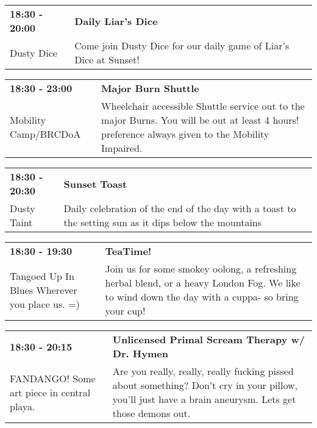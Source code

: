 \begin{tabular}{ p{1in} p{2.2in} }
    \textbf{18:30 - 20:00} & \textbf{Daily Liar's Dice} \\
    Dusty Dice \newline  & Come join Dusty Dice for our daily game of Liar's Dice at Sunset! \\
    \hline 
\end{tabular}
    
\begin{tabular}{ p{1in} p{2.2in} }
    \textbf{18:30 - 23:00} & \textbf{Major Burn Shuttle} \\
    Mobility Camp/BRCDoA \newline  & Wheelchair accessible Shuttle service out to the major Burns. You will be out at least 4 hours! preference always given to the Mobility Impaired. \\
    \hline 
\end{tabular}
    
\begin{tabular}{ p{1in} p{2.2in} }
    \textbf{18:30 - 20:30} & \textbf{Sunset Toast} \\
    Dusty Taint \newline  & Daily celebration of the end of the day with a toast to the setting sun as it dips below the mountains \\
    \hline 
\end{tabular}
    
\begin{tabular}{ p{1in} p{2.2in} }
    \textbf{18:30 - 19:30} & \textbf{TeaTime!} \\
    Tangoed Up In Blues \newline Wherever you place us. =) & Join us for some smokey oolong, a refreshing herbal blend, or a heavy London Fog.  We like to wind down the day with a cuppa- so bring your cup! \\
    \hline 
\end{tabular}
    
\begin{tabular}{ p{1in} p{2.2in} }
    \textbf{18:30 - 20:15} & \textbf{Unlicensed Primal Scream Therapy w/ Dr. Hymen} \\
    FANDANGO! \newline Some art piece in central playa. & Are you really, really, really fucking pissed about something? Don't cry in your pillow, you'll just have a brain aneurysm. Lets get those demons out. \\
    \hline 
\end{tabular}
    
